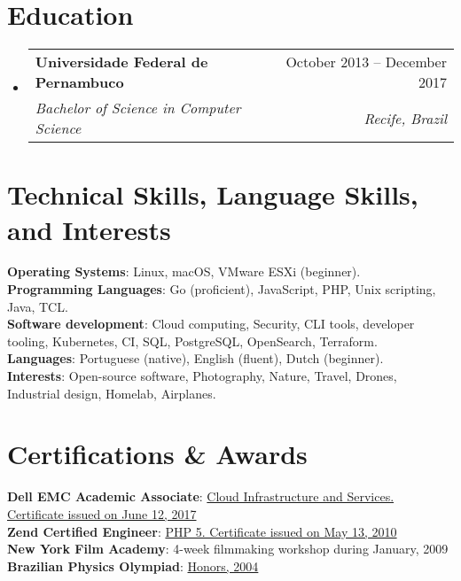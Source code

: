 \documentclass[letterpaper,10pt]{article}
\makeatletter
\newcommand{\resumeSubheading}[4]{
  \vspace{-2pt}\item
    \begin{tabular*}{0.97\textwidth}[t]{l@{\extracolsep{\fill}}r}
      \textbf{#1} & #2 \\
      \textit{\small#3} & \textit{\small #4} \\
    \end{tabular*}\vspace{-7pt}
}
\newcommand{\resumeSubHeadingListStart}{\begin{itemize}[leftmargin=0.15in, label={}]}
\newcommand{\resumeSubHeadingListEnd}{\end{itemize}}
\makeatother
\begin{document}
\vspace{-2pt}
\section{Education}
  \resumeSubHeadingListStart
      \resumeSubheading
      {Universidade Federal de Pernambuco}{October 2013 -- December 2017}
      {Bachelor of Science in Computer Science}{Recife, Brazil}
  \resumeSubHeadingListEnd

\section{Technical Skills, Language Skills, and Interests}
 \begin{itemize}[leftmargin=0.15in, label={}]
    \small{\item{
    \textbf{Operating Systems}{: Linux, macOS, VMware ESXi (beginner).} \\
     \textbf{Programming Languages}{: Go (proficient), JavaScript, PHP, Unix scripting, Java, TCL.} \\
     \textbf{Software development}{: Cloud computing, Security, CLI tools, developer tooling, Kubernetes, CI, SQL, PostgreSQL, OpenSearch, Terraform.} \\
     \textbf{Languages}{: Portuguese (native), English (fluent), Dutch (beginner).} \\
     \textbf{Interests}{: Open-source software, Photography, Nature, Travel, Drones, Industrial design, Homelab, Airplanes.}
    }}
 \end{itemize}

\section{Certifications \& Awards}
 \begin{itemize}[leftmargin=0.15in, label={}]
    \small{\item{
     \textbf{Dell EMC Academic Associate}{: \href{https://www.certmetrics.com/DellEmc/public/verification.aspx?code=Z043ZNDTJMB11QS1}{Cloud Infrastructure and Services. Certificate issued on June 12, 2017}} \\
     \textbf{Zend Certified Engineer}{: \href{https://www.zend-zce.com/en/yellow-pages/ZEND013948}{PHP 5. Certificate issued on May 13, 2010}} \\
     \textbf{New York Film Academy}{: 4-week filmmaking workshop during January, 2009} \\
     \textbf{Brazilian Physics Olympiad}{: \href{https://sec.sbfisica.org.br/olimpiadas/obf2004/resultadofinal_2serie.htm}{Honors, 2004}}
     }}
 \end{itemize}
\end{document}
